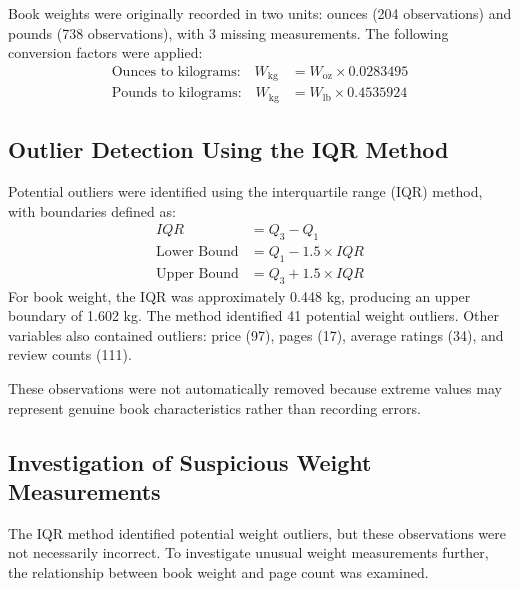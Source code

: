 \documentclass[11pt,a4paper]{article}
\begin{document}
Book weights were originally recorded in two units:
ounces (204 observations) and pounds (738 observations),
with 3 missing measurements. 
The following conversion factors were applied:
\begin{align*}
\text{Ounces to kilograms:}\quad
W_{\mathrm{kg}} &= W_{\mathrm{oz}} \times 0.0283495 \\[8pt]
\text{Pounds to kilograms:}\quad
W_{\mathrm{kg}} &= W_{\mathrm{lb}} \times 0.4535924
\end{align*}

\subsection{Outlier Detection Using the IQR Method}

Potential outliers were identified using the interquartile
range (IQR) method, with boundaries defined as:
\begin{align*}
IQR &= Q_3 - Q_1 \\[6pt]
\text{Lower Bound} &= Q_1 - 1.5 \times IQR \\[6pt]
\text{Upper Bound} &= Q_3 + 1.5 \times IQR
\end{align*}
For book weight, the IQR was approximately 0.448 kg, producing an upper boundary of 1.602 kg. The method identified 41 potential weight outliers. Other variables also contained outliers: price (97), pages (17), average ratings (34), and review counts (111).

These observations were not automatically removed because extreme values may represent genuine book characteristics rather than recording errors.
\newpage
\subsection{Investigation of Suspicious Weight Measurements}
The IQR method identified potential weight outliers, but
these observations were not necessarily incorrect. To investigate unusual weight measurements further, the relationship between book weight and page count was examined.
\end{document}
